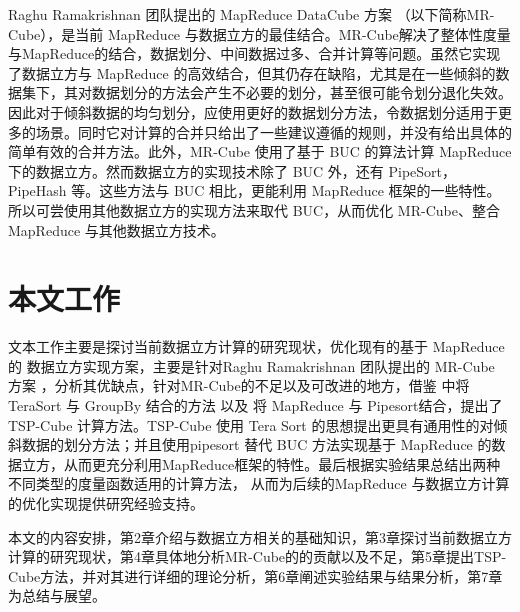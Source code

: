 Raghu Ramakrishnan 团队提出的 MapReduce DataCube 方案 \cite{nandi2012data} \cite{nandi2011distributed}（以下简称MR-Cube），是当前 MapReduce 与数据立方的最佳结合。MR-Cube解决了整体性度量与MapReduce的结合，数据划分、中间数据过多、合并计算等问题。虽然它实现了数据立方与 MapReduce 的高效结合，但其仍存在缺陷，尤其是在一些倾斜的数据集下，其对数据划分的方法会产生不必要的划分，甚至很可能令划分退化失效。因此对于倾斜数据的均匀划分，应使用更好的数据划分方法，令数据划分适用于更多的场景。同时它对计算的合并只给出了一些建议遵循的规则，并没有给出具体的简单有效的合并方法。此外，MR-Cube 使用了基于 BUC \cite{beyer1999bottom} 的算法计算 MapReduce 下的数据立方。然而数据立方的实现技术除了 BUC 外，还有 PipeSort，PipeHash \cite{agarwal1996computation} 等。这些方法与 BUC 相比，更能利用 MapReduce 框架的一些特性。所以可尝使用其他数据立方的实现方法来取代 BUC，从而优化 MR-Cube、整合 MapReduce 与其他数据立方技术。










\section{本文工作}


文本工作主要是探讨当前数据立方计算的研究现状，优化现有的基于 MapReduce 的 数据立方实现方案，主要是针对Raghu Ramakrishnan 团队提出的 MR-Cube 方案 \cite{nandi2012data} \cite{nandi2011distributed}，分析其优缺点，针对MR-Cube的不足以及可改进的地方，借鉴\cite{tao2013minimal} 中将TeraSort 与 GroupBy 结合的方法 以及 将 MapReduce 与 Pipesort结合，提出了TSP-Cube 计算方法。TSP-Cube 使用 Tera Sort 的思想提出更具有通用性的对倾斜数据的划分方法；并且使用pipesort 替代 BUC 方法实现基于 MapReduce 的数据立方，从而更充分利用MapReduce框架的特性。最后根据实验结果总结出两种不同类型的度量函数适用的计算方法， 从而为后续的MapReduce 与数据立方计算的优化实现提供研究经验支持。


本文的内容安排，第2章介绍与数据立方相关的基础知识，第3章探讨当前数据立方计算的研究现状，第4章具体地分析MR-Cube的的贡献以及不足，第5章提出TSP-Cube方法，并对其进行详细的理论分析，第6章阐述实验结果与结果分析，第7章为总结与展望。

